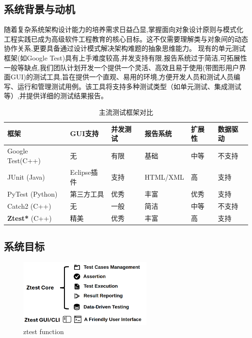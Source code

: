 \documentclass{article}
\begin{document}
\subsection{系统背景与动机}
随着复杂系统架构设计能力的培养需求日益凸显,掌握面向对象设计原则与模式化工程实践已成为高级软件工程教育的核心目标。这不仅需要理解类与对象间的动态协作关系,更要具备通过设计模式解决架构难题的抽象思维能力。
现有的单元测试框架(如Google Test)具有上手难度较高,并发支持有限,报告系统过于简洁,可拓展性一般等缺点,我们团队计划开发一个提供一个灵活、高效且易于使用(带图形用户界面GUI)的测试工具,旨在提供一个直观、易用的环境,方便开发人员和测试人员编写、运行和管理测试用例。该工具将支持多种测试类型（如单元测试、集成测试等）,并提供详细的测试结果报告。
\begin{table}[h]
    \centering
    \caption{主流测试框架对比}
    \label{tab:compare}
    \begin{tabularx}{\textwidth}{lXXXXX}
        \toprule
        \textbf{框架}              & \textbf{GUI支持} & \textbf{并发测试} & \textbf{报告系统} & \textbf{扩展性} & \textbf{数据驱动} \\
        \midrule
        Google Test(C++)         & 无              & 有限            & 基础            & 中等           & 不支持           \\
        JUnit    (Java)          & Eclipse插件      & 支持            & HTML/XML      & 高            & 支持            \\
        PyTest (Python)          & 第三方工具          & 优秀            & 丰富            & 优秀           & 支持            \\
        Catch2   (C++)           & 无              & 一般            & 简洁            & 中等           & 不支持           \\
        \textbf{Ztest*}    (C++) & 精美             & 优秀            & 丰富            & 高            & 支持            \\
        \bottomrule
    \end{tabularx}
\end{table}
\subsection{系统目标}
\begin{figure}[H]
    \centering
    \includegraphics[width=0.6\textwidth]{img/func.png} %
    \caption{ ztest function}
    \label{fig:ztest function }
\end{figure}
\end{document}
